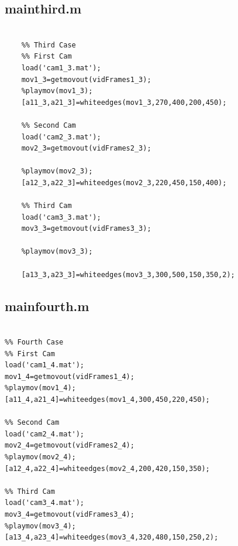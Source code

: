 \documentclass[a4paper]{article}
\begin{document}
\subsection{mainthird.m}
\begin{lstlisting}[style=myMatlabstyle]

 	%% Third Case
 	%% First Cam
 	load('cam1_3.mat');
 	mov1_3=getmovout(vidFrames1_3);
 	%playmov(mov1_3);
 	[a11_3,a21_3]=whiteedges(mov1_3,270,400,200,450);
 	
 	%% Second Cam
 	load('cam2_3.mat');
 	mov2_3=getmovout(vidFrames2_3);
 	
 	%playmov(mov2_3);
 	[a12_3,a22_3]=whiteedges(mov2_3,220,450,150,400);
 	
 	%% Third Cam
 	load('cam3_3.mat');
 	mov3_3=getmovout(vidFrames3_3);
 	
 	%playmov(mov3_3);
 	
 	[a13_3,a23_3]=whiteedges(mov3_3,300,500,150,350,2);

\end{lstlisting}
\subsection{mainfourth.m}
\begin{lstlisting}[style=myMatlabstyle]

%% Fourth Case
%% First Cam
load('cam1_4.mat');
mov1_4=getmovout(vidFrames1_4);
%playmov(mov1_4);
[a11_4,a21_4]=whiteedges(mov1_4,300,450,220,450);

%% Second Cam
load('cam2_4.mat');
mov2_4=getmovout(vidFrames2_4);
%playmov(mov2_4);
[a12_4,a22_4]=whiteedges(mov2_4,200,420,150,350);

%% Third Cam
load('cam3_4.mat');
mov3_4=getmovout(vidFrames3_4);
%playmov(mov3_4);
[a13_4,a23_4]=whiteedges(mov3_4,320,480,150,250,2);

\end{lstlisting}
\end{document}
